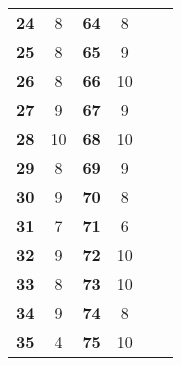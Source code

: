 \begin{table}[]
\begin{tabular}{cccccc}
		\textbf{24}                     & 8                  & \textbf{64}                     & 8                  &                               &                               \\
		\textbf{25}                     & 8                  & \textbf{65}                     & 9                  &                               &                               \\
		\textbf{26}                     & 8                  & \textbf{66}                     & 10                 &                               &                               \\
		\textbf{27}                     & 9                  & \textbf{67}                     & 9                  &                               &                               \\
		\textbf{28}                     & 10                 & \textbf{68}                     & 10                 &                               &                               \\
		\textbf{29}                     & 8                  & \textbf{69}                     & 9                  &                               &                               \\
		\textbf{30}                     & 9                  & \textbf{70}                     & 8                  &                               &                               \\
		\textbf{31}                     & 7                  & \textbf{71}                     & 6                  &                               &                               \\
		\textbf{32}                     & 9                  & \textbf{72}                     & 10                 &                               &                               \\
		\textbf{33}                     & 8                  & \textbf{73}                     & 10                 &                               &                               \\
		\textbf{34}                     & 9                  & \textbf{74}                     & 8                  &                               &                               \\
		\textbf{35}                     & 4                  & \textbf{75}                     & 10                 &                               &                               \\

\end{tabular}
\end{table}
